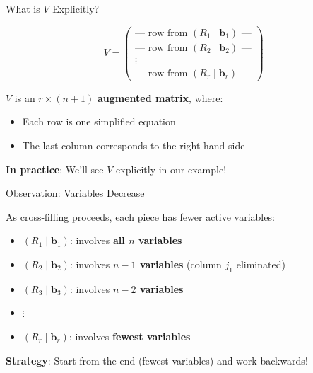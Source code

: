 \documentclass[10pt]{beamer}
\theoremstyle{definition}
\newcommand{\x}[1]{\alert{\textbf{#1}}}
\begin{document}
\begin{frame}{What is $V$ Explicitly?}

$$V = \begin{pmatrix}
\text{— row from } (R_1 \mid \mathbf{b}_1) \text{ —} \\
\text{— row from } (R_2 \mid \mathbf{b}_2) \text{ —} \\
\vdots \\
\text{— row from } (R_r \mid \mathbf{b}_r) \text{ —}
\end{pmatrix}$$

\vspace{0.5em}

$V$ is an $r \times (n+1)$ \x{augmented matrix}, where:
\begin{itemize}
\item Each row is one simplified equation
\item The last column corresponds to the right-hand side
\end{itemize}

\vspace{0.5em}

\x{In practice}: We'll see $V$ explicitly in our example!

\end{frame}

\begin{frame}{Observation: Variables Decrease}

As cross-filling proceeds, each piece has fewer active variables:

\begin{itemize}
\item $(R_1 \mid \mathbf{b}_1)$: involves \x{all $n$ variables}
\item $(R_2 \mid \mathbf{b}_2)$: involves \x{$n-1$ variables} (column $j_1$ eliminated)
\item $(R_3 \mid \mathbf{b}_3)$: involves \x{$n-2$ variables}
\item $\vdots$
\item $(R_r \mid \mathbf{b}_r)$: involves \x{fewest variables}
\end{itemize}

\vspace{1em}

\x{Strategy}: Start from the end (fewest variables) and work backwards!

\end{frame}

\end{document}
